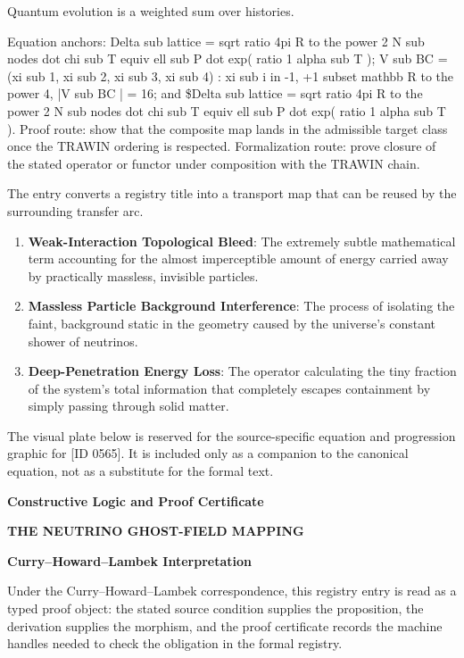 Quantum evolution is a weighted sum over histories.

Equation anchors: Delta sub lattice = sqrt ratio 4pi R to the power 2 N sub nodes dot chi sub T equiv ell sub P dot exp( ratio 1 alpha sub T ); V sub BC = (xi sub 1, xi sub 2, xi sub 3, xi sub 4) : xi sub i in -1, +1 subset mathbb R to the power 4, |V sub BC | = 16; and \$Delta sub lattice = sqrt ratio 4pi R to the power 2 N sub nodes dot chi sub T equiv ell sub P dot exp( ratio 1 alpha sub T ). Proof route: show that the composite map lands in the admissible target class once the TRAWIN ordering is respected. Formalization route: prove closure of the stated operator or functor under composition with the TRAWIN chain.

The entry converts a registry title into a transport map that can be reused by the surrounding transfer arc.
\endgroup

\begin{enumerate}[leftmargin=1.6em,itemsep=6pt,topsep=4pt]
\item \textbf{Weak-Interaction Topological Bleed}: The extremely subtle mathematical term accounting for the almost imperceptible amount of energy carried away by practically massless, invisible particles.
\item \textbf{Massless Particle Background Interference}: The process of isolating the faint, background static in the geometry caused by the universe's constant shower of neutrinos.
\item \textbf{Deep-Penetration Energy Loss}: The operator calculating the tiny fraction of the system's total information that completely escapes containment by simply passing through solid matter.
\end{enumerate}

\begingroup\footnotesize\sloppy
The visual plate below is reserved for the source-specific equation and progression graphic for [ID 0565]. It is included only as a companion to the canonical equation, not as a substitute for the formal text.
\par\endgroup
\ifTZPDarkEdition
{}
\fi

\clearpage
\begingroup\tzpsupportsetup
\noindent\textbf{\fontsize{10.8pt}{12.8pt}\selectfont [ID 0565] Constructive Logic and Proof Certificate}\par
\noindent\textbf{\fontsize{10pt}{12pt}\selectfont THE NEUTRINO GHOST-FIELD MAPPING}\par
\vspace{0.45em}
\begingroup
\footnotesize
\setlength{\parskip}{0.22em}
\setlength{\parindent}{0pt}
\noindent\textbf{Curry--Howard--Lambek Interpretation}\par
Under the Curry--Howard--Lambek correspondence, this registry entry is read as a typed proof
object: the stated source condition supplies the proposition, the derivation supplies the
morphism, and the proof certificate records the machine handles needed to check the obligation
in the formal registry.


